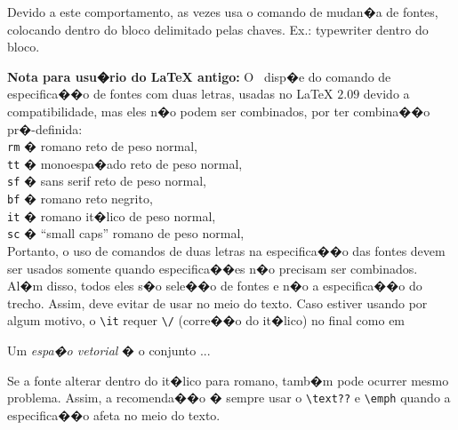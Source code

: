 \documentclass[12pt,a4paper]{article}
\begin{document}
Devido a este comportamento, as vezes usa o comando de mudan�a de fontes, colocando dentro do bloco delimitado pelas chaves.
Ex.: {\ttfamily typewriter} dentro do bloco.


{\bfseries Nota para usu�rio do \LaTeX{} antigo:}
O \LaTeXe \ disp�e do comando de especifica��o de fontes com duas letras, 
usadas no \LaTeX{} $2.09$ devido a compatibilidade, 
mas eles n�o podem ser combinados, por ter 
combina��o pr�-definida: \\
 \texttt{rm} � romano reto de peso normal, \\
 \texttt{tt} � monoespa�ado reto de peso normal, \\
 \texttt{sf} � sans serif reto de peso normal, \\
 \texttt{bf} � romano reto negrito, \\
 \texttt{it} � romano it�lico de peso normal, \\
 \texttt{sc} � ``small caps'' romano de peso normal, \\
 
Portanto, o uso de comandos de duas letras na especifica��o das fontes 
devem ser usados somente quando especifica��es n�o precisam ser combinados.
Al�m disso, todos eles s�o sele��o de fontes e n�o a especifica��o do trecho.
Assim, deve evitar de usar no meio do texto.
Caso estiver usando por algum motivo, o \verb+\it+ requer 
\verb+\/+ (corre��o do it�lico) no final como em

Um {\it espa�o vetorial\/} � o conjunto ...

Se a fonte alterar dentro do it�lico para romano, tamb�m pode ocurrer
mesmo problema. Assim, a recomenda��o � sempre usar o \verb+\text??+ e
\verb+\emph+ quando a especifica��o afeta no meio do texto.
\end{document}
